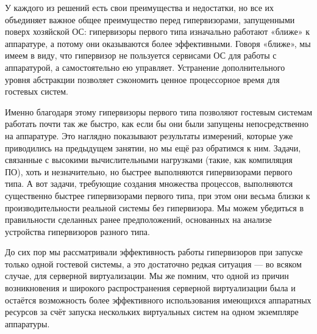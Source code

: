 \documentclass[14pt, a4paper]{article}
\begin{document}
У каждого из решений есть свои преимущества и недостатки, но все их объединяет важное общее
преимущество перед гипервизорами, запущенными поверх хозяйской ОС: гипервизоры первого типа
изначально работают «ближе» к аппаратуре, а потому они оказываются более эффективными. Говоря
«ближе», мы имеем в виду, что гипервизор не пользуется сервисами ОС для работы с аппаратурой, а
самостоятельно ею управляет. Устранение дополнительного уровня абстракции позволяет сэкономить
ценное процессорное время для гостевых систем.

Именно благодаря этому гипервизоры первого типа позволяют гостевым системам работать почти так
же быстро, как если бы они были запущены непосредственно на аппаратуре. Это наглядно
показывают результаты измерений, которые уже приводились на предыдущем занятии, но мы ещё раз
обратимся к ним. Задачи, связанные с высокими вычислительными нагрузками (такие, как компиляция
ПО), хоть и незначительно, но быстрее выполняются гипервизорами первого типа. А вот задачи,
требующие создания множества процессов, выполняются существенно быстрее гипервизорами
первого типа, при этом они весьма близки к производительности реальной системы без гипервизора.
Мы можем убедиться в правильности сделанных ранее предположений, основанных на анализе
устройства гипервизоров разного типа.

\begin{figure}[h]%
    \centering
    \label{framework} %
\end{figure}

До сих пор мы рассматривали эффективность работы гипервизоров при запуске только одной
гостевой системы, а это достаточно редкая ситуация — во всяком случае, для серверной
виртуализации. Мы же помним, что одной из причин возникновения и широкого распространения
серверной виртуализации была и остаётся возможность более эффективного использования
имеющихся аппаратных ресурсов за счёт запуска нескольких виртуальных систем на одном
экземпляре аппаратуры.
\end{document}
